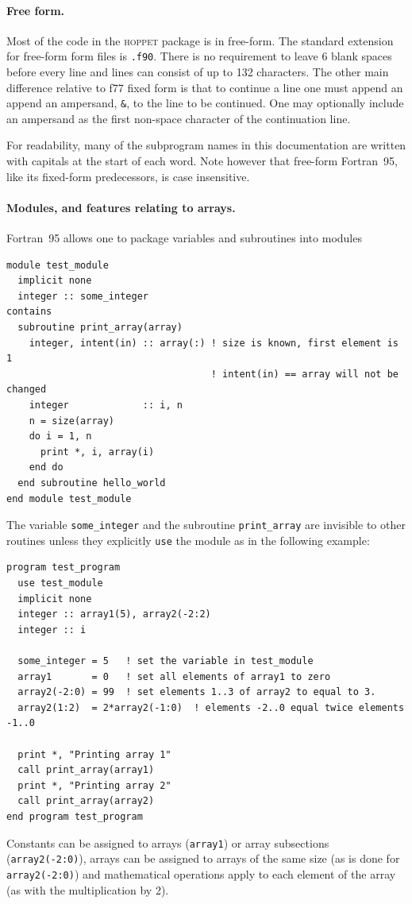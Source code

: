 \documentclass[12pt]{article}
\newcommand{\hoppet}{\textsc{hoppet}\xspace}
\newcommand{\ttt}[1]{\texttt{#1}}
\begin{document}
\paragraph{Free form.}  Most of the code in the \hoppet package is in
free-form. The standard extension for free-form form files is
\ttt{.f90}. There is no requirement to leave 6 blank spaces before
every line and lines can consist of up to 132 characters. The other
main difference relative to f77 fixed form is that to continue a line
one must append an append an ampersand, \ttt{\&}, to the line to be
continued. One may optionally include an ampersand as the first
non-space character of the continuation line.

For readability, many of the subprogram names in this documentation
are written with capitals at the start of each word. Note however that
free-form Fortran~95, like its fixed-form predecessors, is case
insensitive.

\paragraph{Modules, and features relating to arrays.} Fortran~95
allows one to package variables and subroutines into modules
\begin{lstlisting}
module test_module
  implicit none
  integer :: some_integer
contains
  subroutine print_array(array)
    integer, intent(in) :: array(:) ! size is known, first element is 1
                                    ! intent(in) == array will not be changed
    integer             :: i, n
    n = size(array)
    do i = 1, n
      print *, i, array(i)
    end do
  end subroutine hello_world
end module test_module
\end{lstlisting}
The variable \texttt{some\_integer} and the subroutine
\texttt{print\_array} are invisible to other routines unless they
explicitly \texttt{use} the module as in the following example:
\begin{lstlisting}
program test_program
  use test_module
  implicit none
  integer :: array1(5), array2(-2:2)
  integer :: i
  
  some_integer = 5   ! set the variable in test_module
  array1       = 0   ! set all elements of array1 to zero
  array2(-2:0) = 99  ! set elements 1..3 of array2 to equal to 3.
  array2(1:2)  = 2*array2(-1:0)  ! elements -2..0 equal twice elements -1..0

  print *, "Printing array 1"
  call print_array(array1)
  print *, "Printing array 2"
  call print_array(array2)
end program test_program
\end{lstlisting}
Constants can be assigned to arrays (\texttt{array1}) or array
subsections (\texttt{array2(-2:0)}), arrays can be assigned to arrays
of the same size (as is done for \texttt{array2(-2:0)}) and
mathematical operations apply to each element of the array (as with
the multiplication by 2).
\end{document}
